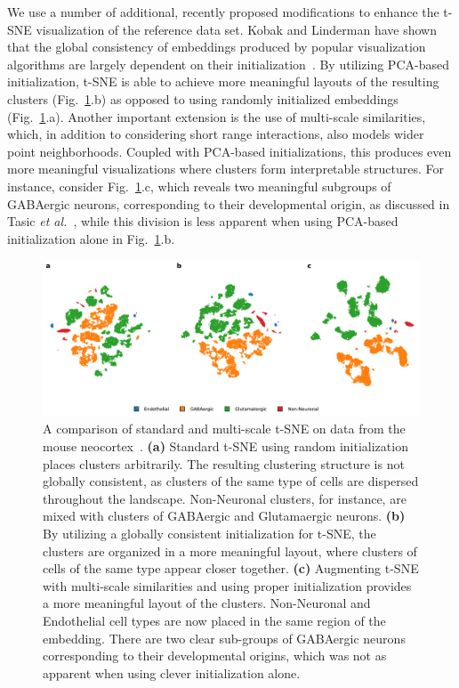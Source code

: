 \documentclass[runningheads]{llncs}
\newcommand{\etal}{\textit{et al.}}
\begin{document}
We use a number of additional, recently proposed modifications to enhance the t-SNE visualization of the reference data set.
Kobak and Linderman have shown that the global consistency of embeddings produced by
popular visualization algorithms are largely dependent on their initialization~\cite{Kobak2019a}. By utilizing PCA-based initialization, t-SNE is able to achieve
more meaningful layouts of the resulting clusters (Fig.~\ref{fig:multiscale}.b)
as opposed to using randomly initialized embeddings (Fig.~\ref{fig:multiscale}.a).
Another important extension is the use of multi-scale similarities, which, in addition
to considering short range interactions, also models wider point neighborhoods. Coupled
with PCA-based initializations, this produces even more meaningful visualizations where
clusters form interpretable structures. For instance, consider Fig.~\ref{fig:multiscale}.c, which reveals two meaningful subgroups of GABAergic neurons, corresponding to their
developmental origin, as discussed in Tasic \etal~\cite{Tasic2018}, while this division
is less apparent when using PCA-based initialization alone in
Fig.~\ref{fig:multiscale}.b.

\begin{figure}[htbp]
  \includegraphics[width=\textwidth]{tasic_multiscale.pdf}
  \caption{A comparison of standard and multi-scale t-SNE on data from the
  mouse neocortex~\cite{Tasic2018}. {\bf (a)} Standard t-SNE using random 
  initialization places clusters arbitrarily. The resulting clustering structure is not globally consistent,
  as clusters of the same type of cells are dispersed throughout the landscape. Non-Neuronal clusters, for instance, are mixed with clusters of GABAergic and Glutamaergic neurons.
  {\bf (b)} By utilizing a globally consistent initialization for t-SNE, the clusters
  are organized in a more meaningful layout, where clusters of cells of the same type appear closer together.
  {\bf (c)} Augmenting t-SNE with multi-scale
  similarities and using proper initialization provides a more meaningful
  layout of the clusters. Non-Neuronal and Endothelial cell types are now placed in
  the same region of the embedding. There are two clear sub-groups of GABAergic
  neurons corresponding to their developmental origins, which was not as apparent
  when using clever initialization alone.}
  \label{fig:multiscale}
\end{figure}
\end{document}
